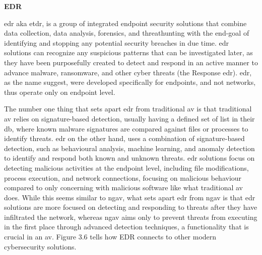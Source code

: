 


\textbf{EDR}

\acrshort{edr} \acrshort{aka} \acrshort{etdr}, is a group of integrated endpoint security solutions that combine data collection,
data analysis, forensics, and \gls{threathunting} with the end-goal of identifying and stopping any potential security breaches in due
time. \acrshort{edr} solutions can recognize any suspicious patterns that can be investigated later, as they have been
purposefully created to detect and respond in an active manner to advance malware, ransomware, and other cyber threats (the Response
\acrshort{edr}). \acrshort{edr}, as the name suggest, were developed specifically for endpoints, and not networks, thus
operate only on endpoint level.

The number one thing that sets apart \acrshort{edr} from traditional \acrshort{av} is that traditional \acrshort{av} relies on
signature-based detection, usually having a defined set of list in their \acrshort{db}, where known malware signatures are compared
against files or processes to identify threats. \acrshort{edr} on the other hand, uses a combination of signature-based detection, such
as behavioural analysis, machine learning, and anomaly detection to identify and respond both known and unknown threats. \acrshort{edr}
solutions focus on detecting malicious activities at the endpoint level, including file modifications, process execution, and network
connections, focusing on malicious behaviour compared to only concerning with malicious software like what traditional \acrshort{av} does.
While this seems similar to \acrshort{ngav}, what sets apart \acrshort{edr} from \acrshort{ngav} is that \acrshort{edr} solutions are
more focused on detecting and responding to threats after they have infiltrated the network, whereas \acrshort{ngav} aims only to
prevent threats from executing in the first place through advanced detection techniques, a functionality that is crucial in an \acrshort{av}.
Figure 3.6 tells how EDR connects to other modern cybersecurity solutions.

